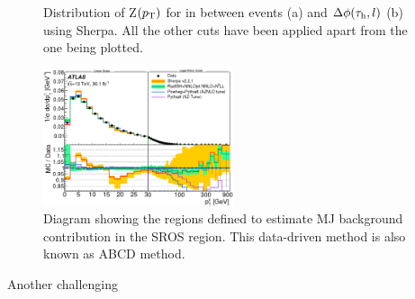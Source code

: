 \begin{figure}[ht]
	\centering
	\hfill
	\caption{Distribution of Z$(p_\text{T})$ for in between events (a) and $\Delta\phi(\tau_\text{h},l)$ (b) using Sherpa. All the other cuts have been applied apart from the one being plotted.}
	\label{Fig19}
\end{figure}
\begin{figure}[h]
	\centering
	\includegraphics[width=0.5\textwidth]{figures/Fig20}
	\caption{Diagram showing the regions defined to estimate MJ background contribution in the SROS region. This data-driven method is also known as ABCD method.}
	\label{Fig20}
\end{figure}

Another challenging 